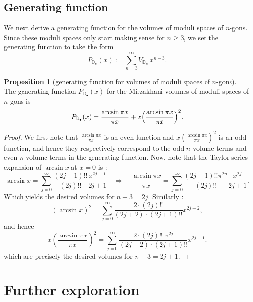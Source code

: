 \documentclass{amsart}
\theoremstyle{definition}
\newtheorem{proposition}{Proposition}[section]
\begin{document}
\subsection{Generating function}
We next derive a generating function for the volumes of moduli spaces of $n$-gons. Since these moduli spaces only start making sense for $n\geqslant3$, we set the generating function to take the form
\[
P_{\mathbb{D}_{\bullet}}(x):=\sum_{n=3}^\infty V_{\mathbb{D}_n}\,x^{n-3}.
\]


\begin{proposition}[generating function for volumes of moduli spaces of $n$-gons]
\label{prop:genfunction}
The generating function $P_{\mathbb{D}_{\bullet}}(x)$ for the Mirzakhani volumes of moduli spaces of $n$-gons is
\begin{align}
P_{\mathbb{D}_{\bullet}}(x)
= 
\frac{\arcsin{\pi x}}{\pi x}
+ 
x\Bigl(\frac{\arcsin{\pi x}}{\pi x}\Bigr)^2. 
\end{align}
\end{proposition}


\begin{proof}
We first note that $\frac{\arcsin{\pi x}}{\pi x}$ is an even function and $x\left(\frac{\arcsin{\pi x}}{\pi x}\right)^2$ is an odd function, and hence they respectively correspond to the odd $n$ volume terms and even $n$ volume terms in the generating function. Now, note that the Taylor series expansion of $\arcsin{x}$ at $x=0$ is \cite[Equation~1.641(1)]{MR2360010}:
\[
\arcsin{x} = \sum_{j=0}^{\infty} \frac{(2j-1)!!}{(2j)!!}\frac{x^{2j+1}}{2j+1}
\quad\Rightarrow\quad
 \frac{\arcsin{\pi x}}{\pi x} 
 = \sum_{j=0}^{\infty} \frac{(2j-1)!! \pi^{2n}}{(2j)!!}\frac{x^{2j}}{2j+1}.
\]
Which yields the desired volumes for $n-3=2j$. Similarly \cite[Equation~1.645(2)]{MR2360010}:
\[
(\arcsin{x})^2 
= \sum_{j=0}^{\infty} 
\frac{2\cdot(2j)!!}{(2j+2)\cdot(2j+1)!!} x^{2j+2},
\]
and hence
\[
x\left(\frac{\arcsin{\pi x}}{\pi x}\right)^2 
= 
\sum_{j=0}^{\infty} 
\frac{2\cdot(2j)!!\;\pi^{2j}}{(2j+2)\cdot(2j+1)!!} x^{2j+1}. 
\]
which are precisely the desired volumes for $n-3=2j+1$.
\end{proof}












\section{Further exploration}
\end{document}
